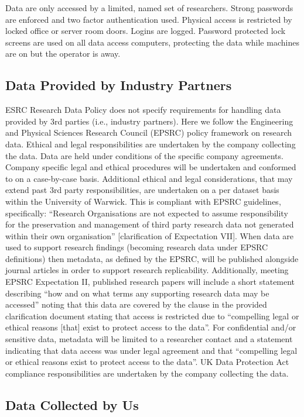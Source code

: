 \documentclass[doc]{apa6}
\begin{document}
Data are only accessed by a limited, named set of researchers. Strong passwords are enforced and two factor authentication used. Physical access is restricted by locked office or server room doors. Logins are logged. Password protected lock screens are used on all data access computers, protecting the data while machines are on but the operator is away. 

\subsection{Data Provided by Industry Partners}

ESRC Research Data Policy does not specify requirements for handling data provided by 3rd parties (i.e., industry partners). Here we follow the Engineering and Physical Sciences Research Council (EPSRC) policy framework on research data. Ethical and legal responsibilities are undertaken by the company collecting the data. Data are held under conditions of the specific company agreements. Company specific legal and ethical procedures will be undertaken and conformed to on a case-by-case basis. Additional ethical and legal considerations, that may extend past 3rd party responsibilities, are undertaken on a per dataset basis within the University of Warwick. This is compliant with EPSRC guidelines, specifically: ``Research Organisations are not expected to assume responsibility for the preservation and management of third party research data not generated within their own organisation'' [clarification of Expectation VII]. When data are used to support research findings (becoming research data under EPSRC definitions) then metadata, as defined by the EPSRC, will be published alongside journal articles in order to support research replicability. Additionally, meeting EPSRC Expectation II, published research papers will include a short statement describing ``how and on what terms any supporting research data may be accessed'' noting that this data are covered by the clause in the provided clarification document stating that access is restricted due to ``compelling legal or ethical reasons [that] exist to protect access to the data''. For confidential and/or sensitive data, metadata will be limited to a researcher contact and a statement indicating that data access was under legal agreement and that ``compelling legal or ethical reasons exist to protect access to the data''. UK Data Protection Act compliance responsibilities are undertaken by the company collecting the data. 

\subsection{Data Collected by Us}
\end{document}
